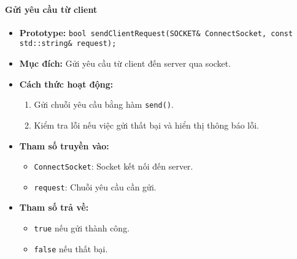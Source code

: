 \paragraph{\textbf{Gửi yêu cầu từ client}}
\begin{itemize}
    \item \textbf{Prototype:} \texttt{bool sendClientRequest(SOCKET\& ConnectSocket, const std::string\& request);}
    
    \item \textbf{Mục đích:} Gửi yêu cầu từ client đến server qua socket.
    
    \item \textbf{Cách thức hoạt động:} 
    \begin{enumerate}
        \item Gửi chuỗi yêu cầu bằng hàm \texttt{send()}.
        \item Kiểm tra lỗi nếu việc gửi thất bại và hiển thị thông báo lỗi.
    \end{enumerate}
    
    \item \textbf{Tham số truyền vào:} 
    \begin{itemize}
        \item \texttt{ConnectSocket}: Socket kết nối đến server.
        \item \texttt{request}: Chuỗi yêu cầu cần gửi.
    \end{itemize}
    
    \item \textbf{Tham số trả về:} 
    \begin{itemize}
        \item \texttt{true} nếu gửi thành công.
        \item \texttt{false} nếu thất bại.
    \end{itemize}
\end{itemize}

